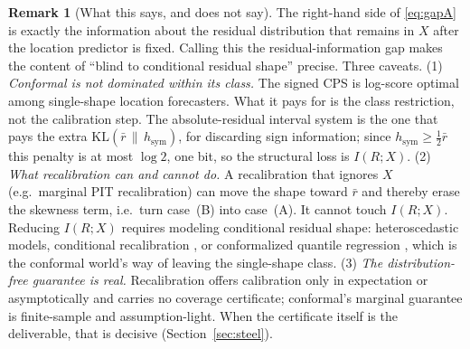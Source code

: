 \documentclass[11pt]{article}
\theoremstyle{definition}
\newtheorem{remark}{Remark}
\newcommand{\KL}{\mathrm{KL}}
\begin{document}
\begin{remark}[What this says, and does not say]
The right-hand side of \eqref{eq:gapA} is exactly the information about the residual
distribution that remains in $X$ after the location predictor is fixed. Calling this the
residual-information gap makes the content of ``blind to conditional residual shape'' precise. Three caveats. (1) \emph{Conformal is not dominated within its class.} The signed CPS is
log-score optimal among single-shape location forecasters. What it pays for is the class
restriction, not the calibration step. The absolute-residual interval system is the one that pays the
extra $\KL(\bar r\,\|\,h_{\mathrm{sym}})$, for discarding sign information; since
$h_{\mathrm{sym}}\ge\tfrac12\bar r$ this penalty is at most $\log 2$, one bit, so the
structural loss is $I(R;X)$. (2)
\emph{What recalibration can and cannot do.} A recalibration that ignores $X$ (e.g.\
marginal PIT recalibration) can move the shape toward $\bar r$ and thereby erase the
skewness term, i.e.\ turn case~(B) into case~(A). It cannot touch $I(R;X)$. Reducing
$I(R;X)$ requires modeling conditional residual shape: heteroscedastic models,
conditional recalibration \citep{kuleshov2018accurate}, or conformalized quantile
regression \citep{romano2019conformalized}, which is the conformal world's way of leaving
the single-shape class. (3) \emph{The distribution-free guarantee is real.} Recalibration
offers calibration only in expectation or asymptotically and carries no coverage
certificate; conformal's marginal guarantee is finite-sample and assumption-light. When
the certificate itself is the deliverable, that is decisive (Section~\ref{sec:steel}).
\end{remark}
\end{document}
